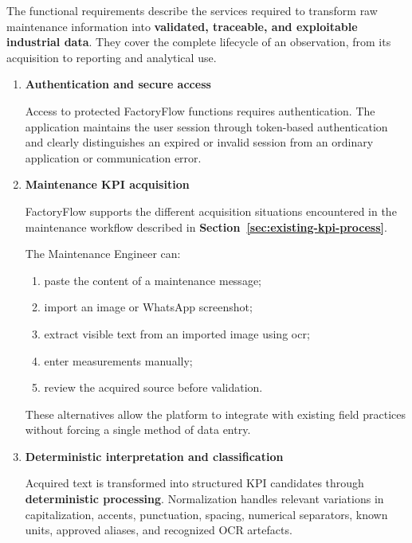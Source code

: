 The functional requirements describe the services required to transform raw
maintenance information into \textbf{validated, traceable, and exploitable
industrial data}. They cover the complete lifecycle of an observation, from
its acquisition to reporting and analytical use.

\begin{enumerate}[label=\textbf{\arabic*.}]

    \item \textbf{Authentication and secure access}

    Access to protected FactoryFlow functions requires authentication.
    The application maintains the user session through token-based
    authentication and clearly distinguishes an expired or invalid session
    from an ordinary application or communication error.


    \item \textbf{Maintenance KPI acquisition}

    FactoryFlow supports the different acquisition situations encountered in
    the maintenance workflow described in
    \textbf{Section~\ref{sec:existing-kpi-process}}.

    The Maintenance Engineer can:
    \begin{enumerate}[label=\textbf{\arabic{enumi}.\arabic*.}]
        \item paste the content of a maintenance message;
        \item import an image or WhatsApp screenshot;
        \item extract visible text from an imported image using \gls{ocr};
        \item enter measurements manually;
        \item review the acquired source before validation.
    \end{enumerate}

    These alternatives allow the platform to integrate with existing field
    practices without forcing a single method of data entry.


    \item \textbf{Deterministic interpretation and classification}

    Acquired text is transformed into structured KPI candidates through
    \textbf{deterministic processing}. Normalization handles relevant
    variations in capitalization, accents, punctuation, spacing, numerical
    separators, known units, approved aliases, and recognized OCR artefacts.


\end{enumerate}
